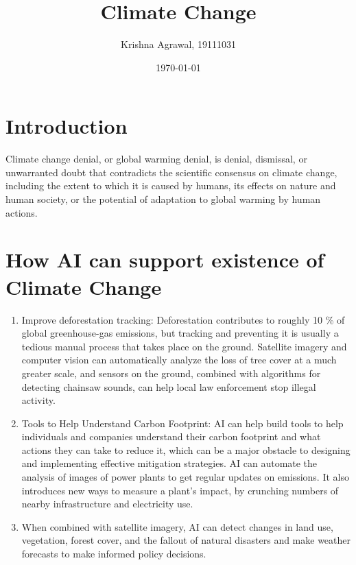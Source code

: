 \documentclass{article}
\title{Climate Change}
\author{Krishna Agrawal, 19111031}
\date{\today}
\begin{document}
\maketitle

\section*{Introduction}
Climate change denial, or global warming denial, is denial, dismissal, or unwarranted doubt that contradicts the scientific consensus on climate change, including the extent to which it is caused by humans, its effects on nature and human society, or the potential of adaptation to global warming by human actions.

\section*{How AI can support existence of Climate Change}

\begin{enumerate}

\item  Improve deforestation tracking:
Deforestation contributes to roughly 10 \% of global greenhouse-gas emissions, but tracking and preventing it is usually a tedious manual process that takes place on the ground. Satellite imagery and computer vision can automatically analyze the loss of tree cover at a much greater scale, and sensors on the ground, combined with algorithms for detecting chainsaw sounds, can help local law enforcement stop illegal activity.

\item Tools to Help Understand Carbon Footprint:
AI can help build tools to help individuals and companies understand their carbon footprint and what actions they can take to reduce it, which can be a major obstacle to designing and implementing effective mitigation strategies. AI can automate the analysis of images of power plants to get regular updates on emissions. It also introduces new ways to measure a plant’s impact, by crunching numbers of nearby infrastructure and electricity use.

\item When combined with satellite imagery, AI can detect changes in land use, vegetation, forest cover, and the fallout of natural disasters and make weather forecasts to make informed policy decisions.


\end{enumerate}
\end{document}
